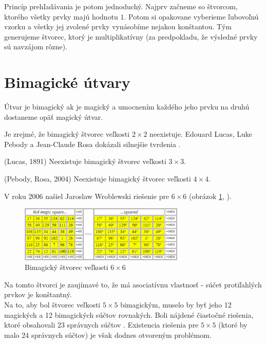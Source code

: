 Princíp prehľadávania je potom jednoduchý. Najprv začneme so štvorcom, ktorého všetky prvky majú hodnotu $1$. Potom si opakovane vyberieme ľubovoľnú vzorku a všetky jej zvolené prvky vynásobíme nejakou konštantou. Tým generujeme štvorec, ktorý je multiplikatívny (za predpokladu, že výsledné prvky sú navzájom rôzne). \\

\section{Bimagické útvary}
\begin{definition} Útvar je bimagický ak je magický a umocnením každého jeho prvku na druhú dostaneme opäť magický útvar.
\end{definition}

Je zrejmé, že bimagický štvorec veľkosti $2 \times 2$ neexistuje. Edouard Lucas, Luke Pebody a Jean-Claude Rosa dokázali silnejšie tvrdenia \cite{multimagie}.

\begin{theorem} (Lucas, 1891) Neexistuje bimagický štvorec veľkosti $3 \times 3$.
\end{theorem}

\begin{theorem} (Pebody, Rosa, 2004) Neexistuje bimagický štvorec veľkosti $4 \times 4$.
\end{theorem}

V roku 2006 našiel Jaroslaw Wroblewski riešenie pre $6 \times 6$ (obrázok \ref{obr:fig_wroblewski_bimagic_6x6}, \cite{multimagie}).

\begin{figure}[H]
\centerline{\includegraphics[width=0.7\textwidth]{images/wroblewski_bimagic_6x6}}
\caption[Bimagický štvorec veľkosti $6 \times 6$]{Bimagický štvorec veľkosti $6 \times 6$ \cite{multimagie}}
\label{obr:fig_wroblewski_bimagic_6x6}
\end{figure}

Na tomto štvorci je zaujímavé to, že má asociatívnu vlastnosť - súčet protiľahlých prvkov je konštantný. \\

Na to, aby bol štvorec veľkosti $5 \times 5$ bimagickým, muselo by byť jeho 12 magických a 12 bimagických súčtov rovnakých. Boli nájdené čiastočné riešenia, ktoré obsahovali 23 správnych súčtov \cite{multimagie}. Existencia riešenia pre $5 \times 5$ (ktoré by malo 24 správnych súčtov) je však dodnes otvoreným problémom. \\

